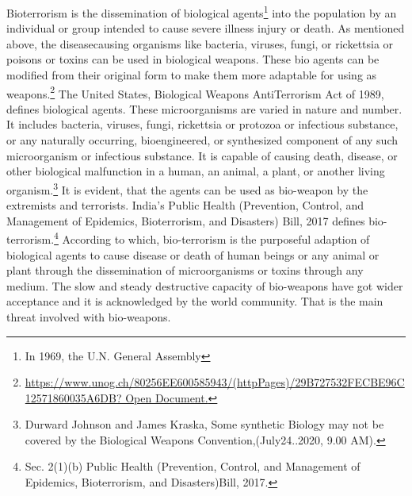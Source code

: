 \begin{multicols}{2}
\noi
Bioterrorism is the dissemination of biological agents\footnote{In 1969, the U.N. General Assembly} into the population by an individual
or group intended to cause severe illness injury or death. As mentioned above, the diseasecausing organisms like bacteria, viruses, fungi, or rickettsia or poisons or toxins can be used
in biological weapons. These bio agents can be modified from their original form to make 
them more adaptable for using as weapons.\footnote{\url{https://www.unog.ch/80256EE600585943/(httpPages)/29B727532FECBE96C12571860035A6DB? Open Document.}} The United States, Biological Weapons AntiTerrorism Act of 1989, defines biological agents. These microorganisms are varied in nature
and number. It includes bacteria, viruses, fungi, rickettsia or protozoa or infectious substance,
or any naturally occurring, bioengineered, or synthesized component of any such
microorganism or infectious substance. It is capable of causing death, disease, or other
biological malfunction in a human, an animal, a plant, or another living organism.\footnote{Durward Johnson and James Kraska, Some synthetic Biology may not be covered by the Biological Weapons
Convention,(July24..2020, 9.00 AM).} It is
evident, that the agents can be used as bio-weapon by the extremists and terrorists. India's
Public Health (Prevention, Control, and Management of Epidemics, Bioterrorism, and
Disasters) Bill, 2017 defines bio-terrorism.\footnote{Sec. 2(1)(b) Public Health (Prevention, Control, and Management of Epidemics, Bioterrorism, and
Disasters)Bill, 2017.} According to which, bio-terrorism is the
purposeful adaption of biological agents to cause disease or death of human beings or any
animal or plant through the dissemination of microorganisms or toxins through any medium.
The slow and steady destructive capacity of bio-weapons have got wider acceptance and it is
acknowledged by the world community. That is the main threat involved with bio-weapons. 



\end{multicols}
